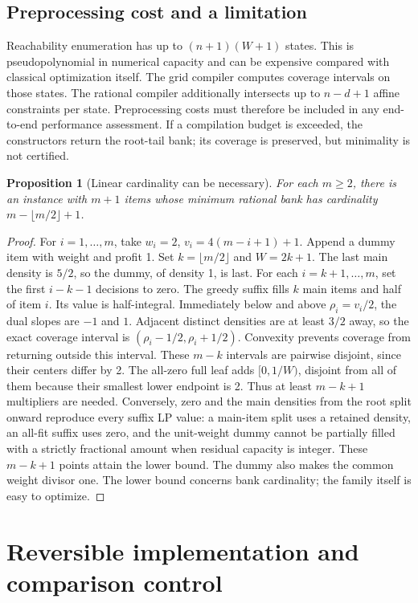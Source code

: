 \documentclass[referee,pdflatex,sn-mathphys-num]{sn-jnl}
\theoremstyle{thmstyleone}
\newtheorem{proposition}[theorem]{Proposition}
\theoremstyle{thmstyletwo}
\begin{document}
\subsection{Preprocessing cost and a limitation}
Reachability enumeration has up to $(n+1)(W+1)$ states. This is pseudopolynomial in numerical capacity and can be expensive compared with classical optimization itself. The grid compiler computes coverage intervals on those states. The rational compiler additionally intersects up to $n-d+1$ affine constraints per state. Preprocessing costs must therefore be included in any end-to-end performance assessment. If a compilation budget is exceeded, the constructors return the root-tail bank; its coverage is preserved, but minimality is not certified.

\begin{proposition}[Linear cardinality can be necessary]\label{prop:barrier}
For each $m\geq2$, there is an instance with $m+1$ items whose minimum rational bank has cardinality $m-\lfloor m/2\rfloor+1$.
\end{proposition}
\begin{proof}
For $i=1,\ldots,m$, take $w_i=2$, $v_i=4(m-i+1)+1$. Append a dummy item with weight and profit 1. Set $k=\lfloor m/2\rfloor$ and $W=2k+1$. The last main density is $5/2$, so the dummy, of density 1, is last. For each $i=k+1,\ldots,m$, set the first $i-k-1$ decisions to zero. The greedy suffix fills $k$ main items and half of item $i$. Its value is half-integral. Immediately below and above $\rho_i=v_i/2$, the dual slopes are $-1$ and $1$. Adjacent distinct densities are at least $3/2$ away, so the exact coverage interval is $(\rho_i-1/2,\rho_i+1/2)$. Convexity prevents coverage from returning outside this interval. These $m-k$ intervals are pairwise disjoint, since their centers differ by 2. The all-zero full leaf adds $[0,1/W)$, disjoint from all of them because their smallest lower endpoint is 2. Thus at least $m-k+1$ multipliers are needed. Conversely, zero and the main densities from the root split onward reproduce every suffix LP value: a main-item split uses a retained density, an all-fit suffix uses zero, and the unit-weight dummy cannot be partially filled with a strictly fractional amount when residual capacity is integer. These $m-k+1$ points attain the lower bound. The dummy also makes the common weight divisor one. The lower bound concerns bank cardinality; the family itself is easy to optimize.
\end{proof}


\section{Reversible implementation and comparison control}\label{sec:circuit}
\end{document}
